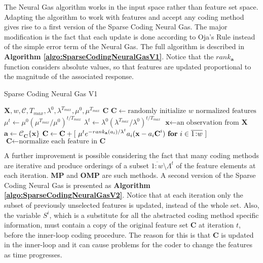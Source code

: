 \documentclass[12pt,a4paper,oneside,english]{UPBThesis}
\newcommand{\hcrange}[2]{\overline{{#1}\colon\!\!{#2}}}
\begin{document}
The Neural Gas algorithm works in the input space rather than feature set space. Adapting the algorithm to work with features and accept any coding method gives rise to a first version of the Sparse Coding Neural Gas. The major modification is the fact that each update is done according to Oja's Rule \cite{oja-rule} instead of the simple error term of the Neural Gas. The full algorithm is described in \textbf{Algorithm \ref{algo:SparseCodingNeuralGasV1}}. Notice that the $rank_{\textbf{a}}$ function considers absolute values, so that features are updated proportional to the magnitude of the associated response.

\begin{algorithm}
\caption{Sparse Coding Neural Gas V1}
\label{algo:SparseCodingNeuralGasV1}
\begin{algorithmic}
\Require $\textbf{X},w,\mathcal{C},T_{max},\lambda^0,\lambda^{T_{max}},\mu^0,\mu^{T_{max}}$
\Ensure $\textbf{C}$
\State $\textbf{C} \gets \mbox{randomly initialize $w$ normalized features}$
\For {$t = \hcrange{1}{T_{max}}$}
\State $\mu^t \gets \mu^0 (\mu^{T_{max}} / \mu^0)^{t / T_{max}}$  
\State $\lambda^t \gets \lambda^0 (\lambda^{T_{max}} / \lambda^0)^{t / T_{max}}$ 
\State $\textbf{x} \gets \text{an observation from $\textbf{X}$}$
\State $\textbf{a} \gets \mathcal{C}_{\textbf{C}}\{ \textbf{x} \}$
\State $\textbf{C} \gets \textbf{C} + [ ~ \mu^t e^{-rank_{\textbf{a}}(a_i) / \lambda^t} a_i (\textbf{x} - a_i \textbf{C}^i) ~ \mbox{\textbf{for} $i \in \hcrange{1}{w}$} ~ ]$
\State $\textbf{C} \gets \mbox{normalize each feature in $\textbf{C}$}$
\EndFor
\end{algorithmic}
\end{algorithm}

A further improvement is possible considering the fact that many coding methods are iterative and produce orderings of a subset $\hcrange{1}{w} \setminus \Lambda^t$ of the feature elements at each iteration. \textbf{MP} and \textbf{OMP} are such methods. A second version of the Sparse Coding Neural Gas is presented as \textbf{Algorithm \ref{algo:SparseCodingNeuralGasV2}}. Notice that at each iteration only the subset of previously unselected features is updated, instead of the whole set. Also, the variable $S^i$, which is a substitute for all the abstracted coding method specific information, must contain a copy of the original feature set $\textbf{C}$ at iteration $t$, before the inner-loop coding procedure. The reason for this is that $\textbf{C}$ is updated in the inner-loop and it can cause problems for the coder to change the features as time progresses.
\end{document}
